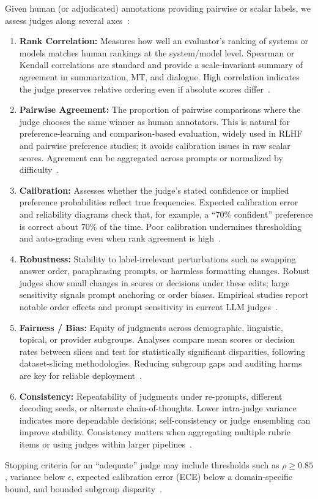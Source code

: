 Given human (or adjudicated) annotations providing pairwise or scalar labels, we assess judges along several axes~\cite{li2024_llmsasjudges, bavaresco2024judgebench, hada2024metal, liang2022helm}:
\begin{enumerate}
\item \textbf{Rank Correlation:} Measures how well an evaluator’s ranking of systems or models matches human rankings at the system/model level. Spearman or Kendall correlations are standard and provide a scale-invariant summary of agreement in summarization, MT, and dialogue. High correlation indicates the judge preserves relative ordering even if absolute scores differ~\cite{bavaresco2024judgebench, zheng2023judgelm}.
\item \textbf{Pairwise Agreement:} The proportion of pairwise comparisons where the judge chooses the same winner as human annotators. This is natural for preference-learning and comparison-based evaluation, widely used in RLHF and pairwise preference studies; it avoids calibration issues in raw scalar scores. Agreement can be aggregated across prompts or normalized by difficulty~\cite{liu2024pairs, bavaresco2024judgebench}.
\item \textbf{Calibration:} Assesses whether the judge’s stated confidence or implied preference probabilities reflect true frequencies. Expected calibration error and reliability diagrams check that, for example, a “70\% confident” preference is correct about 70\% of the time. Poor calibration undermines thresholding and auto-grading even when rank agreement is high~\cite{stiennon2020learning, ouyang2022training}.
\item \textbf{Robustness:} Stability to label-irrelevant perturbations such as swapping answer order, paraphrasing prompts, or harmless formatting changes. Robust judges show small changes in scores or decisions under these edits; large sensitivity signals prompt anchoring or order biases. Empirical studies report notable order effects and prompt sensitivity in current LLM judges~\cite{li2024_llmsasjudges, hada2024metal, zheng2023judgelm}.
\item \textbf{Fairness / Bias:} Equity of judgments across demographic, linguistic, topical, or provider subgroups. Analyses compare mean scores or decision rates between slices and test for statistically significant disparities, following dataset-slicing methodologies. Reducing subgroup gaps and auditing harms are key for reliable deployment~\cite{liang2022helm, hada2024metal}.
\item \textbf{Consistency:} Repeatability of judgments under re-prompts, different decoding seeds, or alternate chain-of-thoughts. Lower intra-judge variance indicates more dependable decisions; self-consistency or judge ensembling can improve stability. Consistency matters when aggregating multiple rubric items or using judges within larger pipelines~\cite{li2024_llmsasjudges}.
\end{enumerate}
Stopping criteria for an ``adequate'' judge may include thresholds such as $\rho \ge 0.85$, variance below $\epsilon$, expected calibration error (ECE) below a domain-specific bound, and bounded subgroup disparity~\cite{liang2022helm, bavaresco2024judgebench}. %

